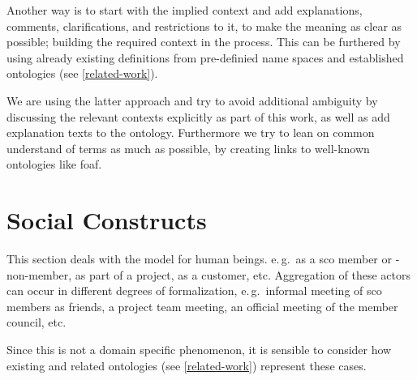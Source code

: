 \documentclass[a4paper, DIV=13, BCOR=0cm]{scrbook}
\newcommand{\eg}{e.\,g.\ }
\begin{document}
Another way is to start with the implied context and add explanations, comments, clarifications, and restrictions to it, to make the meaning as clear as possible; building the required context in the process. This can be furthered by using already existing definitions from pre-definied name spaces and established ontologies (see \autoref{related-work}).

We are using the latter approach and try to avoid additional ambiguity by discussing the relevant contexts explicitly as part of this work, as well as add explanation texts to the ontology. Furthermore we try to lean on common understand of terms as much as possible, by creating links to well-known ontologies like \gls{foaf}.

\section{Social Constructs }
 This section deals with the model for human beings.
 \eg as a \gls{sco} member or -non-member, as part of a project, as a customer, etc.
 Aggregation of these actors can occur in different degrees of formalization, \eg informal meeting of \gls{sco} members as friends, a project team meeting, an official meeting of the member council, etc. 

Since this is not a domain specific phenomenon, it is sensible to consider how existing and related ontologies (see \autoref{related-work}) represent these cases.
\end{document}
